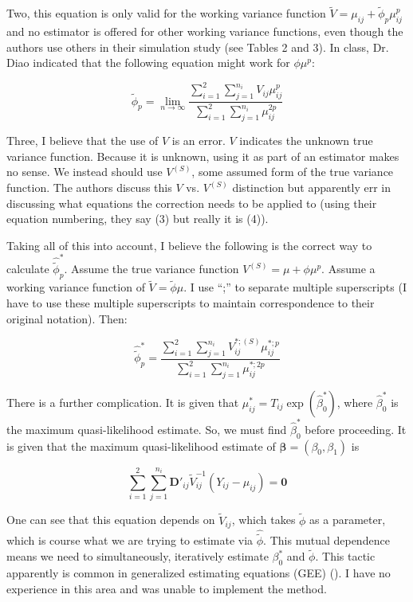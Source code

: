 \documentclass{article}
\begin{document}
Two, this equation is only valid for the working variance function $\tilde{V} = \mu_{ij} + \tilde{\phi}_p
\mu_{ij}^p$ and no estimator is offered for other working variance functions, even though
the authors use others in their simulation study (see Tables 2 and 3). In class, Dr.
Diao indicated that the following equation might work for $\phi \mu^p$:

\begin{equation}
	\tilde{\phi}_p =  \lim_{n \to \infty} \frac{\sum_{i=1}^2
	\sum_{j=1}^{n_i}V_{ij} \mu_{ij}^{p}}{\sum_{i=1}^{2}
	\sum_{j=1}^{n_i}\mu_{ij}^{2p}}
\end{equation}

Three, I believe that the use of $V$ is an error. $V$ indicates
the unknown true variance function. Because it is unknown, using it as part of
an estimator makes no sense. We instead should use $V^{(S)}$, some assumed form
of the true variance function. The authors discuss this $V$ vs. $V^{(S)}$
distinction but apparently err in discussing what equations the correction needs
to be applied to (using their equation numbering, they say (3) but really it is
(4)).

Taking all of this into account, I believe the following is the correct way to
calculate $\hat{\tilde{\phi}}_p^*$. Assume the true variance function
$V^{(S)}=\mu + \phi \mu^p$. Assume a working variance function of $\tilde{V} =
\tilde{\phi}\mu$. I use ``;'' to separate multiple superscripts (I have to use
these multiple superscripts to maintain correspondence to their original
notation). Then:

$$
	\hat{\tilde{\phi}}_p^* = \frac{\sum_{i=1}^2
	\sum_{j=1}^{n_i}V^{*; (S)}_{ij} \mu_{ij}^{*; p}}{\sum_{i=1}^{2}
	\sum_{j=1}^{n_i}\mu_{ij}^{*; 2p}}
$$

There is a further complication. It is given that $\mu_{ij}^* = T_{ij}
\exp{(\hat{\beta}_0^*)}$, where $\hat{\beta}_0^*$ is the maximum
quasi-likelihood estimate. So, we must find $\hat{\beta}_0^*$ before
proceeding. It is given that the maximum quasi-likelihood estimate of 
$\bm{\beta}=(\beta_0, \beta_1)$ is

$$
	\sum_{i=1}^2 \sum_{j=1}^{n_i} \bm{D}'_{ij} \tilde{V}_{ij}^{-1}(Y_{ij}-\mu_{ij})
	= \bm{0}
$$

One can see that this equation depends on $\tilde{V}_{ij}$, which takes
$\tilde{\phi}$ as a parameter, which is course what we are trying to estimate
via $\hat{\tilde{\phi}}$. This mutual dependence means we need to
simultaneously, iteratively estimate $\beta_0^*$ and $\tilde{\phi}$. This tactic 
apparently is common in generalized estimating equations (GEE) (\cite{zeger1988models}). 
I have no
experience in this area and was unable to implement the method.
\end{document}
